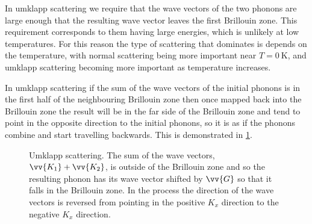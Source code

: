 \documentclass[fleqn]{NotesClass}
\begin{document}
    In umklapp scattering we require that the wave vectors of the two phonons are large enough that the resulting wave vector leaves the first Brillouin zone.
    This requirement corresponds to them having large energies, which is unlikely at low temperatures.
    For this reason the type of scattering that dominates is depends on the temperature, with normal scattering being more important near \(T = \qty{0}{\kelvin}\), and umklapp scattering becoming more important as temperature increases.
    
    In umklapp scattering if the sum of the wave vectors of the initial phonons is in the first half of the neighbouring Brillouin zone then once mapped back into the Brillouin zone the result will be in the far side of the Brillouin zone and tend to point in the opposite direction to the initial phonons, so it is as if the phonons combine and start travelling backwards.
    This is demonstrated in \cref{fig:umklapp scattering}.
    
    \begin{figure}
        \caption[Umklapp scattering.]{Umklapp scattering. The sum of the wave vectors, \(\vv{K_1} + \vv{K_2}\), is outside of the Brillouin zone and so the resulting phonon has its wave vector shifted by \(\vv{G}\) so that it falls in the Brillouin zone. In the process the direction of the wave vectors is reversed from pointing in the positive \(K_x\) direction to the negative \(K_x\) direction.}
        \label{fig:umklapp scattering}
    \end{figure}
    
\end{document}
